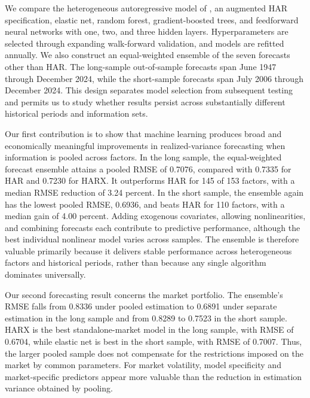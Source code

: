 \documentclass[preprint,12pt,authoryear]{elsarticle}
\begin{document}
We compare the heterogeneous autoregressive model of \citet{corsi2009}, an augmented HAR specification, elastic net, random forest, gradient-boosted trees, and feedforward neural networks with one, two, and three hidden layers. Hyperparameters are selected through expanding walk-forward validation, and models are refitted annually. We also construct an equal-weighted ensemble of the seven forecasts other than HAR. The long-sample out-of-sample forecasts span June 1947 through December 2024, while the short-sample forecasts span July 2006 through December 2024. This design separates model selection from subsequent testing and permits us to study whether results persist across substantially different historical periods and information sets.

Our first contribution is to show that machine learning produces broad and economically meaningful improvements in realized-variance forecasting when information is pooled across factors. In the long sample, the equal-weighted forecast ensemble attains a pooled RMSE of 0.7076, compared with 0.7335 for HAR and 0.7230 for HARX. It outperforms HAR for 145 of 153 factors, with a median RMSE reduction of 3.24 percent. In the short sample, the ensemble again has the lowest pooled RMSE, 0.6936, and beats HAR for 110 factors, with a median gain of 4.00 percent. Adding exogenous covariates, allowing nonlinearities, and combining forecasts each contribute to predictive performance, although the best individual nonlinear model varies across samples. The ensemble is therefore valuable primarily because it delivers stable performance across heterogeneous factors and historical periods, rather than because any single algorithm dominates universally.

Our second forecasting result concerns the market portfolio. The ensemble's RMSE falls from 0.8336 under pooled estimation to 0.6891 under separate estimation in the long sample and from 0.8289 to 0.7523 in the short sample. HARX is the best standalone-market model in the long sample, with RMSE of 0.6704, while elastic net is best in the short sample, with RMSE of 0.7007. Thus, the larger pooled sample does not compensate for the restrictions imposed on the market by common parameters. For market volatility, model specificity and market-specific predictors appear more valuable than the reduction in estimation variance obtained by pooling.
\end{document}
